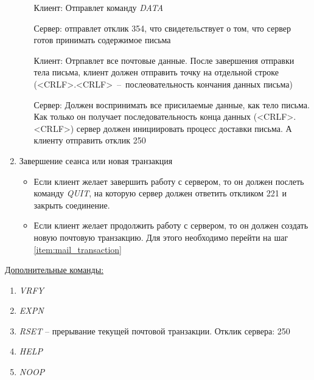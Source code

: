 \documentclass[a4paper,12pt]{report}
\begin{document}
\begin{enumerate}
\begin{enumerate}
	         Клиент: Отправлет команду \textit{DATA} 
	         
	         Сервер: отправлет отклик 354, что свидетельствует о том, что сервер готов принимать содержимое письма
	         
	         Клиент: Отрпавлет все почтовые данные. После завершения отправки тела письма, клиент должен отправить точку на отдельной строке (<CRLF>.<CRLF>~--~послеовательность кончания данных письма)
	         
	         Сервер: Должен воспринимать все присилаемые данные, как тело письма. Как только он получает последовательность конца данных (<CRLF>.<CRLF>) сервер должен инициировать процесс доставки письма. А клиенту отправить отклик 250
	     \end{enumerate}
	     
	     \item Завершение сеанса или новая транзакция
	     \begin{itemize}
	         \item Если клиент желает завершить работу с сервером, то он должен послеть команду \textit{QUIT}, на которую сервер должен ответить откликом 221 и закрыть соединение.
	         \item Если клиент желает продолжить работу с сервером, то он должен создать новую почтовую транзакцию. Для этого необходимо перейти на шаг \ref{item:mail_transaction}
	     \end{itemize}
	 \end{enumerate}
	 
	 \underline{Дополнительные команды:}
	 \begin{enumerate}
	     \item \textit{VRFY}
	     \item \textit{EXPN}
	     \item \textit{RSET} -- прерывание текущей почтовой транзакции. Отклик сервера: 250
	     \item \textit{HELP}
	     \item \textit{NOOP}
	 \end{enumerate}
	 
\end{document}
